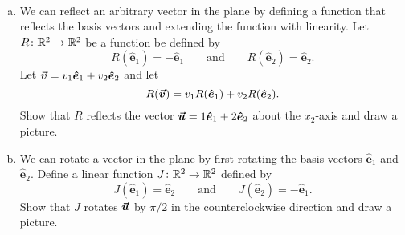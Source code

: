 \documentclass[12pt]{article} %
\newcommand{\ehat}{\boldsymbol{\hat{e}}}
\begin{document}
\newpage
\begin{problem}~
\begin{enumerate}[(a)]
    \item We can reflect an arbitrary vector in the plane by defining a function that reflects the basis vectors and extending the function with linearity. Let $R\colon \mathbb{R}^2 \to \mathbb{R}^2$ be a function be defined by
    \[
    R(\ehat_1) = -\ehat_1 \qquad \textrm{and} \qquad R(\ehat_2)=\ehat_2.
    \]
    Let $\vecv = v_1 \ehat_1 + v_2 \ehat_2$ and let
    \[
    R(\vecv) = v_1 R(\ehat_1) + v_2 R(\ehat_2).
    \]
    Show that $R$ reflects the vector $\vecu = 1\ehat_1 + 2\ehat_2$ about the $x_2$-axis and draw a picture.
    \item We can rotate a vector in the plane by first rotating the basis vectors $\ehat_1$ and $\ehat_2$. Define a linear function $J\colon \mathbb{R}^2 \to \mathbb{R}^2$ defined by
    \[
    J(\ehat_1)=\ehat_2 \qquad \textrm{and} \qquad J(\ehat_2)=-\ehat_1.
    \]
    \noindent Show that $J$ rotates $\boldsymbol{\vec{u}}$ by $\pi/2$ in the counterclockwise direction and draw a picture.
\end{enumerate}
\end{problem}
\end{document}
